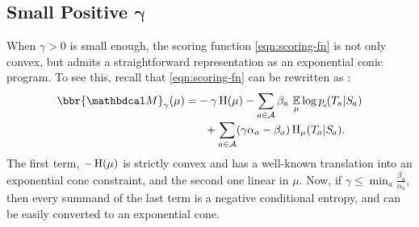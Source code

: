 \documentclass[twoside]{article}
\begin{document}
\subsection{%
    Small Positive
    \texorpdfstring{$\boldsymbol\gamma$}{gamma}%
} \label{sec:small-gamma}

When $\gamma > 0$ is small enough,
the scoring function \eqref{eqn:scoring-fn} is not only convex,
but admits a straightforward representation as an exponential conic program.
To see this, recall that \eqref{eqn:scoring-fn}
 can be rewritten as \parencite[Proposition 4.6]{pdg-aaai}:
\begin{equation}
    \begin{aligned}
        \bbr{\dg M}_\gamma(\mu) =
        &-\gamma\H(\mu) -
            \sum_{a \in \Ar}
                \beta_a\, \Ex_\mu
                    \log {p\ssub a(\Tgt a | \Src a)}
                \\[-0.5ex]
            &~~+ \sum_{a \in \Ar}
            (\gamma \alpha_a - \beta_a)
                \H_\mu (\Tgt a | \Src a).
    \end{aligned}
    \label{eq:altscore}
\end{equation}
The first term, $-\operatorname{\mathrm{H}}(\mu)$ is strictly convex and has a well-known
translation into an exponential cone constraint, and the second one linear in $\mu$.
Now, if $\gamma \le \min_{a} \frac{\beta_a}{\alpha_a}$, then every summand of the last term is a negative conditional entropy, and can be easily converted to an exponential cone.
\end{document}
